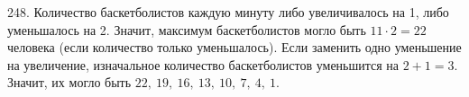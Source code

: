 248. Количество баскетболистов каждую минуту либо увеличивалось на 1, либо уменьшалось на 2. Значит, максимум баскетболистов могло быть $11\cdot2=22$ человека (если количество только уменьшалось). Если заменить одно уменьшение на увеличение, изначальное количество баскетболистов уменьшится на $2+1=3.$ Значит, их могло быть $22,\ 19,\ 16,\ 13,\ 10,\ 7,\ 4,\ 1.$\\
